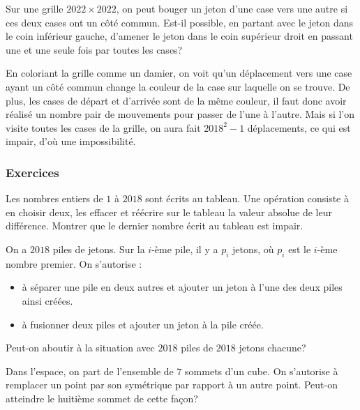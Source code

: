 \begin{exo}
Sur une grille $2022\times2022$, on peut bouger un jeton d'une case vers une autre si ces deux cases ont un côté commun. Est-il possible, en partant avec le jeton dans le coin inférieur gauche, d'amener le jeton dans le coin supérieur droit en passant une et une seule fois par toutes les cases? 
\end{exo}

\begin{sol}
En coloriant la grille comme un damier, on voit qu'un déplacement vers une case ayant un côté commun change la couleur de la case sur laquelle on se trouve. De plus, les cases de départ et d'arrivée sont de la même couleur, il faut donc avoir réalisé un nombre pair de mouvements pour passer de l'une à l'autre. Mais si l'on visite toutes les cases de la grille, on aura fait $2018^2-1$ déplacements, ce qui est impair, d'où une impossibilité.
\end{sol}

\subsubsection{Exercices}

\begin{exo}
Les nombres entiers de $1$ à $2018$ sont écrits au tableau. Une opération consiste à en choisir deux, les effacer et réécrire sur le tableau la valeur absolue de leur différence. Montrer que le dernier nombre écrit au tableau est impair.
\end{exo}

\begin{exo}
On a $2018$ piles de jetons. Sur la $i$-ème pile, il y a $p_i$ jetons, où $p_i$ est le $i$-ème nombre premier. On s'autorise :
\begin{itemize}
\item
à séparer une pile en deux autres et ajouter un jeton à l'une des deux piles ainsi créées.
\item
à fusionner deux piles et ajouter un jeton à la pile créée.
\end{itemize}
Peut-on aboutir à la situation avec $2018$ piles de $2018$ jetons chacune?
\end{exo}

\begin{exo}
Dans l'espace, on part de l'ensemble de $7$ sommets d'un cube. On s'autorise à remplacer un point par son symétrique par rapport à un autre point. Peut-on atteindre le huitième sommet de cette façon?
\end{exo}

